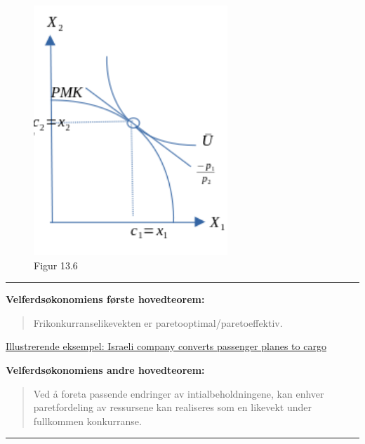 \documentclass[
  letterpaper,
  DIV=11,
  numbers=noendperiod]{scrartcl}
\begin{document}
\begin{figure}[H]

{\centering \includegraphics[width=0.65\textwidth,height=\textheight]{drawio/samm_eff_m.png}

}

\caption{Figur 13.6}

\end{figure}%

\begin{center}\rule{0.5\linewidth}{0.5pt}\end{center}

\textbf{Velferdsøkonomiens første hovedteorem:}

\begin{quote}
Frikonkurranselikevekten er paretooptimal/paretoeffektiv.
\end{quote}

\href{https://www.i24news.tv/en/news/israel/economy/1645636837-israeli-company-converts-passenger-planes-to-cargo}{Illustrerende
eksempel: Israeli company converts passenger planes to cargo}

\textbf{Velferdsøkonomiens andre hovedteorem:}

\begin{quote}
Ved å foreta passende endringer av intialbeholdningene, kan enhver
paretfordeling av ressursene kan realiseres som en likevekt under
fullkommen konkurranse.
\end{quote}

\begin{center}\rule{0.5\linewidth}{0.5pt}\end{center}
\end{document}
